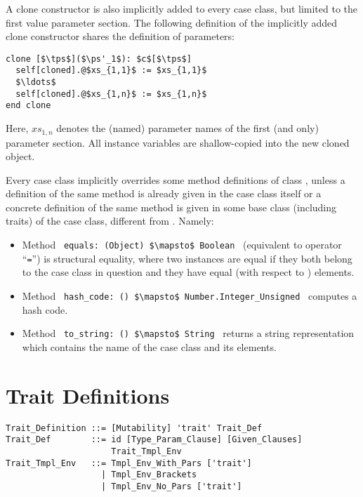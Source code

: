 A clone constructor is also implicitly added to every case class, but limited to the first value parameter section. The following definition of the implicitly added clone constructor shares the definition of parameters: 
\begin{lstlisting}
clone [$\tps$]($\ps'_1$): $c$[$\tps$]
  self[cloned].@$xs_{1,1}$ := $xs_{1,1}$
  $\ldots$
  self[cloned].@$xs_{1,n}$ := $xs_{1,n}$
end clone
\end{lstlisting}
Here, $xs_{1,n}$ denotes the (named) parameter names of the first (and only) parameter section. All instance variables are shallow-copied into the new cloned object. 

Every case class implicitly overrides some method definitions of class , unless a definition of the same method is already given in the case class itself or a concrete definition of the same method is given in some base class (including traits) of the case class, different from . Namely: 
\begin{itemize}
  \item[] Method ~\lstinline!equals: (Object) $\mapsto$ Boolean!~ (equivalent to operator ``\lstinline!=!'') is structural equality, where two instances are equal if they both belong to the case class in question and they have equal (with respect to ) elements. 

  \item[] Method ~\lstinline!hash_code: () $\mapsto$ Number.Integer_Unsigned!~ computes a hash code. 

  \item[] Method ~\lstinline!to_string: () $\mapsto$ String!~ returns a string representation which contains the name of the case class and its elements. 
\end{itemize}





\section{Trait Definitions}
\label{sec:traits}

\grammar\begin{lstlisting}
Trait_Definition ::= [Mutability] 'trait' Trait_Def
Trait_Def        ::= id [Type_Param_Clause] [Given_Clauses]
                     Trait_Tmpl_Env
Trait_Tmpl_Env   ::= Tmpl_Env_With_Pars ['trait']
                   | Tmpl_Env_Brackets
                   | Tmpl_Env_No_Pars ['trait']
\end{lstlisting}

